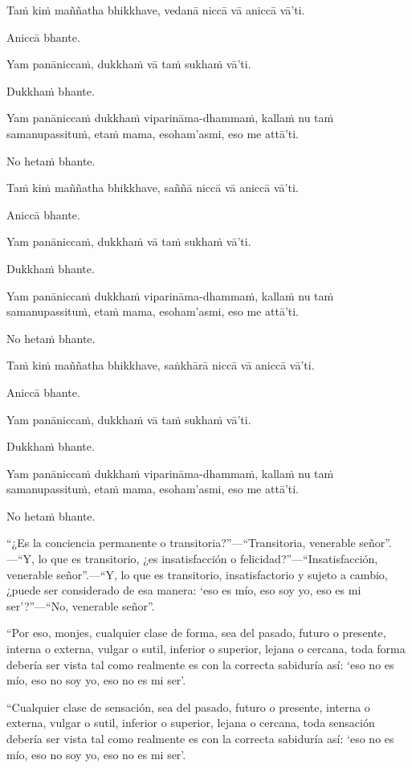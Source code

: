 \paliText
\markboth{\paliTitle}{\rightmark}

Taṁ kiṁ maññatha bhikkhave, vedanā niccā vā aniccā vā'ti.

Aniccā bhante.

Yam panāniccaṁ, dukkhaṁ vā taṁ sukhaṁ vā'ti.

Dukkhaṁ bhante.

Yam panāniccaṁ dukkhaṁ viparināma-dhammaṁ, kallaṁ nu taṁ samanupassituṁ,
etaṁ mama, esoham'asmi, eso me attā'ti.

No hetaṁ bhante.

Taṁ kiṁ maññatha bhikkhave, saññā niccā vā aniccā vā'ti.

Aniccā bhante.

Yam panāniccaṁ, dukkhaṁ vā taṁ sukhaṁ vā'ti.

Dukkhaṁ bhante.

Yam panāniccaṁ dukkhaṁ viparināma-dhammaṁ, kallaṁ nu taṁ samanupassituṁ,
etaṁ mama, esoham'asmi, eso me attā'ti.

No hetaṁ bhante.

Taṁ kiṁ maññatha bhikkhave, saṅkhārā niccā vā aniccā vā'ti.

Aniccā bhante.

Yam panāniccaṁ, dukkhaṁ vā taṁ sukhaṁ vā'ti.

Dukkhaṁ bhante.

Yam panāniccaṁ dukkhaṁ viparināma-dhammaṁ, kallaṁ nu taṁ samanupassituṁ,
etaṁ mama, esoham'asmi, eso me attā'ti.

No hetaṁ bhante.

\clearpage

\englishText
\markboth{\englishTitle}{\rightmark}

“¿Es la conciencia permanente o transitoria?”—“Transitoria, venerable señor”.—“Y, lo que es transitorio, ¿es insatisfacción o felicidad?”—“Insatisfacción, venerable señor”.—“Y, lo que es transitorio, insatisfactorio y sujeto a cambio, ¿puede ser considerado de esa manera: ‘eso es mío, eso soy yo, eso es mi ser’?”—“No, venerable señor”.

“Por eso, monjes, cualquier clase de forma, sea del pasado, futuro o presente, interna o externa, vulgar o sutil, inferior o superior, lejana o cercana, toda forma debería ser vista tal como realmente es con la correcta sabiduría así: ‘eso no es mío, eso no soy yo, eso no es mi ser’.

“Cualquier clase de sensación, sea del pasado, futuro o presente, interna o externa, vulgar o sutil, inferior o superior, lejana o cercana, toda sensación debería ser vista tal como realmente es con la correcta sabiduría así: ‘eso no es mío, eso no soy yo, eso no es mi ser’.

